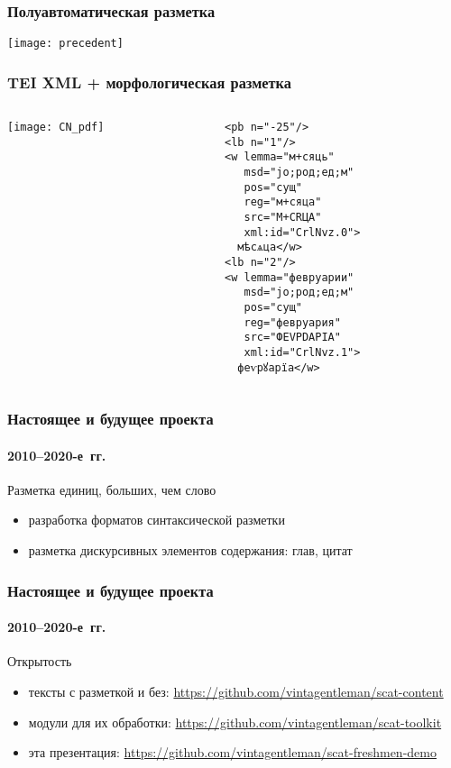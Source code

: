 \begin{frame}
  \frametitle{Полуавтоматическая разметка}

  \begin{center}
    \texttt{[image: precedent]}
  \end{center}
\end{frame}

\begin{frame}[fragile]
  \frametitle{TEI XML + морфологическая разметка}

  \begin{columns}[c]
    \begin{column}{6cm}
      \texttt{[image: CN\_pdf]}
    \end{column}

    \begin{column}{6cm}
      \begin{Verbatim}[fontsize=\footnotesize]
<pb n="-25"/>
<lb n="1"/>
<w lemma="м+сяць"
   msd="jo;род;ед;м"
   pos="сущ"
   reg="м+сяца"
   src="М+СRЦА"
   xml:id="CrlNvz.0">
  мѣсѧца</w>
<lb n="2"/>
<w lemma="февруарии"
   msd="jo;род;ед;м"
   pos="сущ"
   reg="февруария"
   src="ФЕVРDАРIА"
   xml:id="CrlNvz.1">
  феѵрꙋарїа</w>
\end{Verbatim}
    \end{column}
  \end{columns}
\end{frame}

\begin{frame}
  \frametitle{Настоящее и будущее проекта}
  \framesubtitle{2010--2020-е~гг.}

  \begin{block}{Разметка единиц, больших, чем слово}
    \begin{itemize}
      \item разработка форматов синтаксической разметки\autocite{gorlov:2018}
      \item разметка дискурсивных элементов содержания: глав\autocite{rogozina:2015}, цитат\autocite{alexeeva:2019}
    \end{itemize}
  \end{block}
\end{frame}

\begin{frame}
  \frametitle{Настоящее и будущее проекта}
  \framesubtitle{2010--2020-е~гг.}

  \begin{block}{Открытость}
    \begin{itemize}
      \item тексты с разметкой и без: \url{https://github.com/vintagentleman/scat-content}
      \item модули для их обработки: \url{https://github.com/vintagentleman/scat-toolkit}
      \item эта презентация: \url{https://github.com/vintagentleman/scat-freshmen-demo}
    \end{itemize}
  \end{block}
\end{frame}


